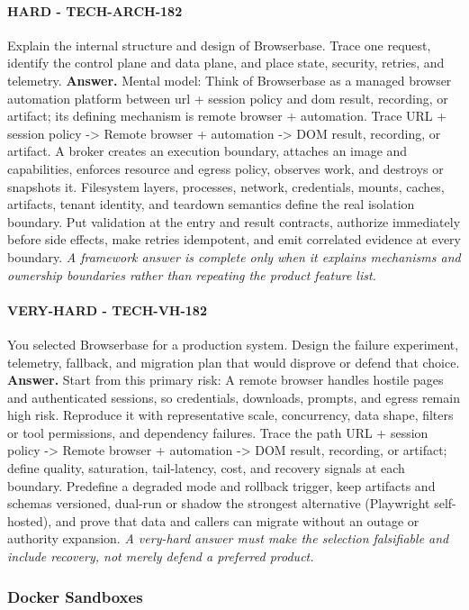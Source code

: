 \paragraph{HARD - TECH-ARCH-182} Explain the internal structure and design of Browserbase. Trace one request, identify the control plane and data plane, and place state, security, retries, and telemetry.
\textbf{Answer.} Mental model: Think of Browserbase as a managed browser automation platform between url + session policy and dom result, recording, or artifact; its defining mechanism is remote browser + automation. Trace URL + session policy -> Remote browser + automation -> DOM result, recording, or artifact. A broker creates an execution boundary, attaches an image and capabilities, enforces resource and egress policy, observes work, and destroys or snapshots it. Filesystem layers, processes, network, credentials, mounts, caches, artifacts, tenant identity, and teardown semantics define the real isolation boundary. Put validation at the entry and result contracts, authorize immediately before side effects, make retries idempotent, and emit correlated evidence at every boundary.
\textit{A framework answer is complete only when it explains mechanisms and ownership boundaries rather than repeating the product feature list.}
\paragraph{VERY-HARD - TECH-VH-182} You selected Browserbase for a production system. Design the failure experiment, telemetry, fallback, and migration plan that would disprove or defend that choice.
\textbf{Answer.} Start from this primary risk: A remote browser handles hostile pages and authenticated sessions, so credentials, downloads, prompts, and egress remain high risk. Reproduce it with representative scale, concurrency, data shape, filters or tool permissions, and dependency failures. Trace the path URL + session policy -> Remote browser + automation -> DOM result, recording, or artifact; define quality, saturation, tail-latency, cost, and recovery signals at each boundary. Predefine a degraded mode and rollback trigger, keep artifacts and schemas versioned, dual-run or shadow the strongest alternative (Playwright self-hosted), and prove that data and callers can migrate without an outage or authority expansion.
\textit{A very-hard answer must make the selection falsifiable and include recovery, not merely defend a preferred product.}
\subsubsection*{Docker Sandboxes}
